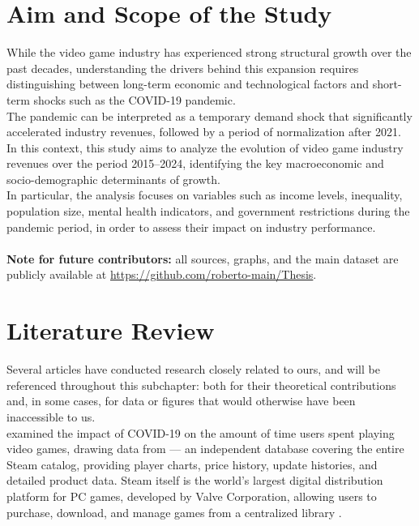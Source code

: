\section{Aim and Scope of the Study}
While the video game industry has experienced strong structural growth over the past decades, understanding the drivers behind this expansion requires distinguishing between long-term economic and technological factors and short-term shocks such as the COVID-19 pandemic.\\
The pandemic can be interpreted as a temporary demand shock that significantly accelerated industry revenues, followed by a period of normalization after 2021.\\
In this context, this study aims to analyze the evolution of video game industry revenues over the period 2015–2024, identifying the key macroeconomic and socio-demographic determinants of growth.\\
In particular, the analysis focuses on variables such as income levels, inequality, population size, mental health indicators, and government restrictions during the pandemic period, in order to assess their impact on industry performance.\\\\
\noindent\textbf{Note for future contributors:} all sources, 
graphs, and the main dataset are publicly available at 
\url{https://github.com/roberto-main/Thesis}.
 

\section{Literature Review}

Several articles have conducted research closely related to ours, 
and will be referenced throughout this subchapter: both for their 
theoretical contributions and, in some cases, for data or figures 
that would otherwise have been inaccessible to us.\\

\cite{chang2021videogame_pandemic} examined the impact of COVID-19 
on the amount of time users spent playing video games, drawing data 
from \cite{steamdb} — an independent database covering the entire 
Steam catalog, providing player charts, price history, update 
histories, and detailed product data. Steam itself is the world's 
largest digital distribution platform for PC games, developed by 
Valve Corporation, allowing users to purchase, download, and manage 
games from a centralized library \citep{steam_about}.\\

